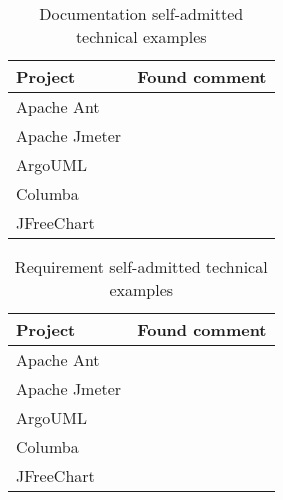 \begin{table}[!hbt]
      \begin{center}
            \caption{Documentation self-admitted technical examples}
            \label{tab:documentation_debt_detail}
            \begin{tabular}{l| c }
            \toprule
            \textbf{Project}      & \textbf{Found comment}     \\ \midrule 
              Apache Ant          &   \\                                   
              Apache Jmeter       &   \\                                   
              ArgoUML             &   \\                                   
              Columba             &   \\                                   
              JFreeChart          &   \\ \bottomrule
            \end{tabular}
      \end{center}
\end{table}

\begin{table}[!hbt]
      \begin{center}
            \caption{Requirement self-admitted technical examples}
            \label{tab:requeriment_debt_detail}
            \begin{tabular}{l| c }
            \toprule
            \textbf{Project}      & \textbf{Found comment}     \\ \midrule 
              Apache Ant          &   \\                                   
              Apache Jmeter       &   \\                                   
              ArgoUML             &   \\                                   
              Columba             &   \\                                   
              JFreeChart          &   \\ \bottomrule
            \end{tabular}
      \end{center}
\end{table}

